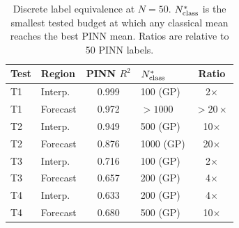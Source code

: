 \begin{table}[t]
\centering
\scriptsize
\setlength{\tabcolsep}{2.3pt}
\caption{Discrete label equivalence at $N=50$. $N^*_{\rm class}$ is the smallest tested budget at which any classical mean reaches the best PINN mean. Ratios are relative to 50 PINN labels.}
\label{tab:label_equivalence}
\begin{tabular}{@{}llclc@{}}
\toprule
Test & Region & PINN $R^2$ & $N^*_{\rm class}$ & Ratio \\
\midrule
T1 & Interp. & 0.999 & 100 (GP) & 2$\times$ \\
T1 & Forecast & 0.972 & $>1000$ & $>20\times$ \\
T2 & Interp. & 0.949 & 500 (GP) & 10$\times$ \\
T2 & Forecast & 0.876 & 1000 (GP) & 20$\times$ \\
T3 & Interp. & 0.716 & 100 (GP) & 2$\times$ \\
T3 & Forecast & 0.657 & 200 (GP) & 4$\times$ \\
T4 & Interp. & 0.633 & 200 (GP) & 4$\times$ \\
T4 & Forecast & 0.680 & 500 (GP) & 10$\times$ \\
\bottomrule
\end{tabular}
\end{table}
